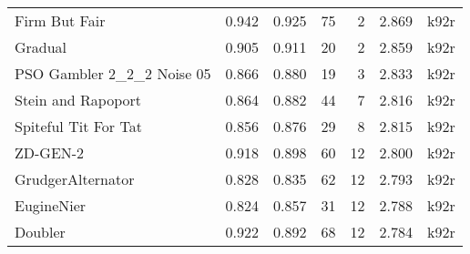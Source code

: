 \begin{tabular}{lrrrrrl}
Firm But Fair              &                               0.942 &                            0.925 &            75 &     2 &  2.869 &                  k92r \\
Gradual                    &                               0.905 &                            0.911 &            20 &     2 &  2.859 &                  k92r \\
PSO Gambler 2\_2\_2 Noise 05 &                               0.866 &                            0.880 &            19 &     3 &  2.833 &                  k92r \\
Stein and Rapoport         &                               0.864 &                            0.882 &            44 &     7 &  2.816 &                  k92r \\
Spiteful Tit For Tat       &                               0.856 &                            0.876 &            29 &     8 &  2.815 &                  k92r \\
ZD-GEN-2                   &                               0.918 &                            0.898 &            60 &    12 &  2.800 &                  k92r \\
GrudgerAlternator          &                               0.828 &                            0.835 &            62 &    12 &  2.793 &                  k92r \\
EugineNier                 &                               0.824 &                            0.857 &            31 &    12 &  2.788 &                  k92r \\
Doubler                    &                               0.922 &                            0.892 &            68 &    12 &  2.784 &                  k92r \\
\bottomrule
\end{tabular}
